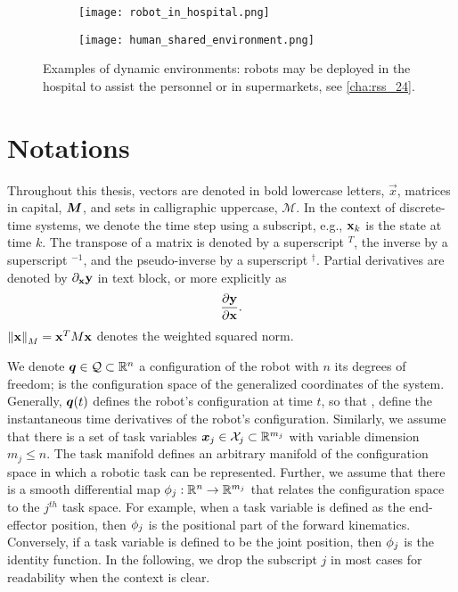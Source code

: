 \begin{figure}[ht]
  \centering
  \begin{subfigure}[b]{0.6\textwidth}
    \texttt{[image: robot\_in\_hospital.png]}
  \end{subfigure}
  \hfill
  \begin{subfigure}[b]{0.3\textwidth}
    \texttt{[image: human\_shared\_environment.png]}
  \end{subfigure}
  \caption{Examples of dynamic environments: robots may be
  deployed in the hospital to assist the personnel
  \cite{mivseikis2020lio} or in supermarkets, see
  \cref{cha:rss_24}.}
  \label{fig:dynamic_environments}
\end{figure}



\section{Notations} %
\label{sec:notations}

Throughout this thesis, vectors are denoted in bold lowercase
letters, $\vec{x}$, matrices in capital, $\bm{M}$, and sets
in calligraphic uppercase, $\mathcal{M}$. In the context of
discrete-time systems, we denote the time step using a
subscript, e.g., $\mathbf{x}_k$ is the state at time $k$. The
transpose of a matrix is denoted by a superscript $^T$, 
the inverse by a superscript $^{-1}$, and the pseudo-inverse by a
superscript $^{\dagger}$. Partial derivatives are denoted by 
$\partial_{\mathbf{x}}\mathbf{y}$ in text block, or more explicitly as
\[\frac{\partial\mathbf{y}}{\partial\mathbf{x}}.\]
 $\left\lVert\mathbf{x}\right\rVert_M = \mathbf{x}^TM\mathbf{x}$
denotes the weighted squared norm. 


We denote $\bm{q}\in\mathcal{Q}\subset\mathbb{R}^n$ a configuration of the robot
with $n$ its degrees of freedom; \Q{} is the configuration
space of the generalized coordinates of the system.
Generally, $\bm{q}(t)$ defines the robot's configuration at time
$t$, so that \qdot{}, \qddot{} define the instantaneous time
derivatives of the robot's configuration. Similarly, we
assume that there is a set of task variables
$\bm{x}_j\in\mathcal{X}_j\subset\mathbb{R}^{m_j}$ with variable dimension $m_j \leq n$.
The task manifold \Xj{} defines an arbitrary manifold of the
configuration space \Q{} in which a robotic task can be
represented. Further, we assume that there is a smooth differential
map $\phi_j:\mathbb{R}^n\rightarrow\mathbb{R}^{m_j}$ that relates the
configuration space to the $j^{th}$ task space. For example,
when a task variable is defined as the end-effector
position, then $\phi_j$ is the positional part of the
forward kinematics. Conversely,
if a task variable is
defined to be the joint position, then $\phi_j$ is the
identity function. In the following, we drop the subscript
$j$ in most cases for readability when the context is clear.

